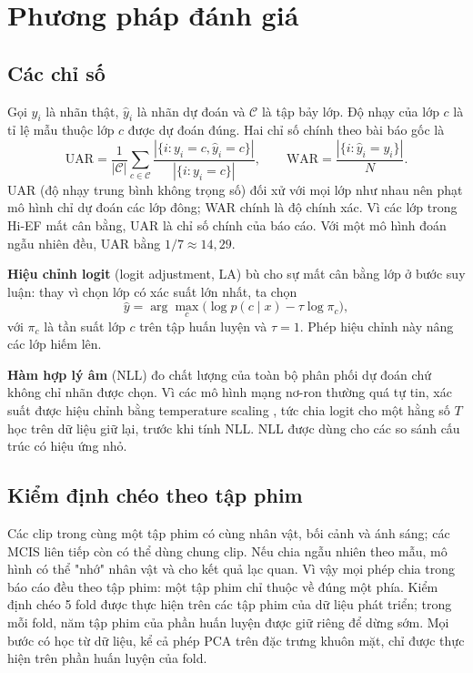 \section{Phương pháp đánh giá}

\subsection{Các chỉ số}

Gọi $y_i$ là nhãn thật, $\hat y_i$ là nhãn dự đoán và $\mathcal{C}$ là tập bảy lớp. Độ nhạy của lớp $c$ là tỉ lệ mẫu thuộc lớp $c$ được dự đoán đúng. Hai chỉ số chính theo bài báo gốc là
\begin{equation}
	\mathrm{UAR} = \frac{1}{|\mathcal{C}|}\sum_{c \in \mathcal{C}} \frac{|\{i: y_i = c, \hat y_i = c\}|}{|\{i: y_i = c\}|}, \qquad
	\mathrm{WAR} = \frac{|\{i: \hat y_i = y_i\}|}{N}.
\end{equation}
UAR (độ nhạy trung bình không trọng số) đối xử với mọi lớp như nhau nên phạt mô hình chỉ dự đoán các lớp đông; WAR chính là độ chính xác. Vì các lớp trong Hi-EF mất cân bằng, UAR là chỉ số chính của báo cáo. Với một mô hình đoán ngẫu nhiên đều, UAR bằng $1/7 \approx 14{,}29$.

\textbf{Hiệu chỉnh logit} (logit adjustment, LA) \cite{menon2021logit} bù cho sự mất cân bằng lớp ở bước suy luận: thay vì chọn lớp có xác suất lớn nhất, ta chọn
\begin{equation}
	\hat y = \arg\max_{c} \big(\log p(c \mid x) - \tau \log \pi_c\big),
\end{equation}
với $\pi_c$ là tần suất lớp $c$ trên tập huấn luyện và $\tau = 1$. Phép hiệu chỉnh này nâng các lớp hiếm lên.

\textbf{Hàm hợp lý âm} (NLL) đo chất lượng của toàn bộ phân phối dự đoán chứ không chỉ nhãn được chọn. Vì các mô hình mạng nơ-ron thường quá tự tin, xác suất được hiệu chỉnh bằng temperature scaling \cite{guo2017calibration}, tức chia logit cho một hằng số $T$ học trên dữ liệu giữ lại, trước khi tính NLL. NLL được dùng cho các so sánh cấu trúc có hiệu ứng nhỏ.

\subsection{Kiểm định chéo theo tập phim}

Các clip trong cùng một tập phim có cùng nhân vật, bối cảnh và ánh sáng; các MCIS liên tiếp còn có thể dùng chung clip. Nếu chia ngẫu nhiên theo mẫu, mô hình có thể "nhớ" nhân vật và cho kết quả lạc quan. Vì vậy mọi phép chia trong báo cáo đều theo tập phim: một tập phim chỉ thuộc về đúng một phía. Kiểm định chéo 5 fold được thực hiện trên các tập phim của dữ liệu phát triển; trong mỗi fold, năm tập phim của phần huấn luyện được giữ riêng để dừng sớm. Mọi bước có học từ dữ liệu, kể cả phép PCA trên đặc trưng khuôn mặt, chỉ được thực hiện trên phần huấn luyện của fold.


